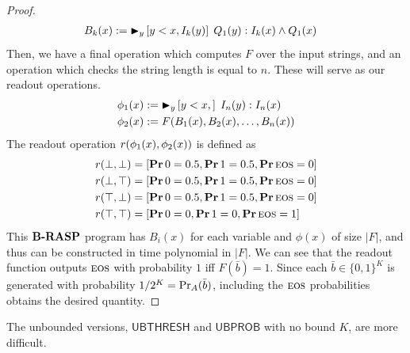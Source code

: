 \documentclass[acmsmall,screen,review,anonymous,nonacm]{PLDI/acmart}
\begin{document}
\begin{proof}
    \begin{align*}
        B_k(x) &:= {{{{\blacktriangleright}}_{y} \left[y<x, I_k(y)\right] \; Q_1(y) : I_k(x)\land Q_1(x)}}
    \end{align*}
    Then, we have a final operation which computes $F$ over the input strings, and an operation which checks the string length is equal to $n$. 
    These will serve as our readout operations.
    \begin{align*}
        \phi_1(x)&:= {{{{\blacktriangleright}}_{y} \left[y<x, \right] \; I_n(y) : I_n(x)}}\\
        \phi_2(x)&:= F(B_1(x),B_2(x),\ldots, B_n(x))
    \end{align*}
    The readout operation ${r}(\phi_1(x),\phi_2(x))$ is defined as 
    \begin{align*}
        {r}(\bot,\bot) & = [\mathop{\mathbf{Pr}}0=0.5,\mathop{\mathbf{Pr}}1=0.5,\mathop{\mathbf{Pr}}{{\textsc{eos}}}=0]\\
        {r}(\bot,\top) & = [\mathop{\mathbf{Pr}}0=0.5,\mathop{\mathbf{Pr}}1=0.5,\mathop{\mathbf{Pr}}{{\textsc{eos}}}=0]\\
        {r}(\top,\bot) & = [\mathop{\mathbf{Pr}}0=0.5,\mathop{\mathbf{Pr}}1=0.5,\mathop{\mathbf{Pr}}{{\textsc{eos}}}=0]\\
        {r}(\top,\top) & = [\mathop{\mathbf{Pr}}0=0,\mathop{\mathbf{Pr}}1=0,\mathop{\mathbf{Pr}}{{\textsc{eos}}}=1]\\
    \end{align*}
    This ${\textbf{B-RASP}}$ program has $B_i(x)$ for each variable and $\phi(x)$ of size $|F|$, and thus can be constructed in time polynomial in $|F|$.
    We can see that the readout function outputs ${{\textsc{eos}}}$ with probability $1$ iff $F(\bar{b})=1$. 
    Since each $\bar{b}\in\{0,1\}^K$ is generated with probability $1/2^K={\textnormal{Pr}_{{A}}(\bar{b})}$, including the ${{\textsc{eos}}}$ probabilities obtains the desired quantity. 
    
\end{proof}

The unbounded versions, $\mathsf{UBTHRESH}$ and  $\mathsf{UBPROB}$ with no bound $K$, are more difficult.
\end{document}
